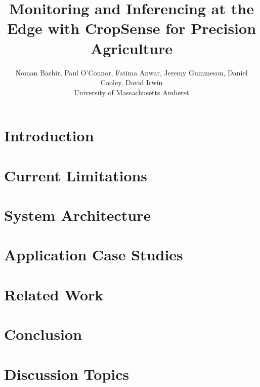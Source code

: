 \documentclass[letterpaper,twocolumn,10pt]{article}
\newcommand{\myname}{{CropSense}}
\begin{document}
\title{\Large \bf Monitoring and Inferencing at the Edge with \myname{} for Precision Agriculture}


\newcommand\fatima[1]{\textcolor{magenta}{Fatima: #1}}
\newcommand\noman[1]{\textcolor{red}{Noman: #1}}

\author{
{\rm Noman Bashir, Paul O'Connor, Fatima Anwar, Jeremy Gummeson, Daniel Cooley, David Irwin}\\
University of Massachusetts Amherst
} %




\maketitle

\begin{abstract}

\end{abstract}

\section{Introduction}


\section{Current Limitations}


\section{System Architecture}

\label{design}

\section{Application Case Studies}

\label{casestudies}

%

\section{Related Work}

\label{related}

\section{Conclusion}

\label{conclusion}

\section{Discussion Topics}

\label{discussion}



\end{document}
